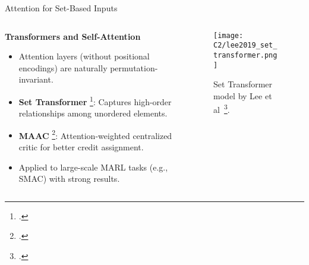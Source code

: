 
\begin{frame}{Attention for Set-Based Inputs}
    \begin{columns}
        \begin{column}{0.6\textwidth}
            \textbf{Transformers and Self-Attention}
            \begin{itemize}
                \item Attention layers (without positional encodings) are naturally permutation-invariant.
                \item \textbf{Set Transformer} \footcite{lee2019}: 
                    Captures high-order relationships among unordered elements.
                \item \textbf{MAAC} \footcite{iqbal2019}: 
                    Attention-weighted centralized critic for better credit assignment.
                \item Applied to large-scale MARL tasks (e.g., SMAC) with strong results.
            \end{itemize}
        \end{column}
        \begin{column}{0.4\textwidth}
            \begin{figure}
                \texttt{[image: C2/lee2019\_set\_transformer.png]}
                \caption{Set Transformer model by Lee et al~\footcite{lee2019}.}
            \end{figure}
        \end{column}
    \end{columns}
\end{frame}

